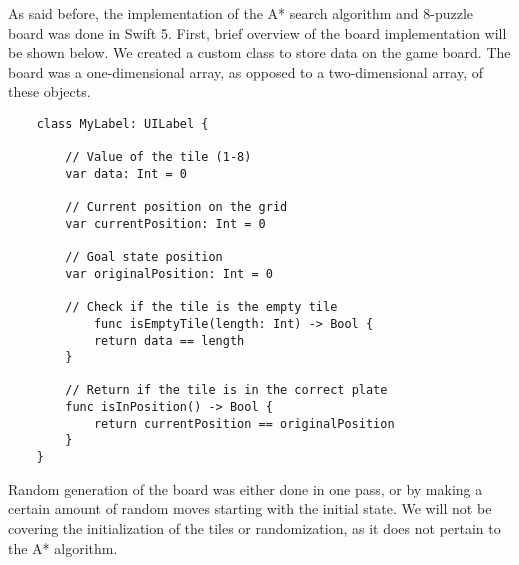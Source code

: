 \documentclass[titlepage]{article}
\begin{document}
As said before, the implementation of the A* search algorithm and 8-puzzle board was done in Swift 5. First, brief overview of the board implementation will be shown below. We created a custom class to store data on the game board. The board was a one-dimensional array, as opposed to a two-dimensional array, of these objects. 
\vspace{6mm}

\begin{lstlisting}
	class MyLabel: UILabel {
	
		// Value of the tile (1-8)
		var data: Int = 0
	
		// Current position on the grid
		var currentPosition: Int = 0
	
		// Goal state position
		var originalPosition: Int = 0
		
		// Check if the tile is the empty tile
			func isEmptyTile(length: Int) -> Bool {
			return data == length
		}
	
		// Return if the tile is in the correct plate
		func isInPosition() -> Bool {
			return currentPosition == originalPosition
		}
	}
\end{lstlisting}
\vspace{6mm}
Random generation of the board was either done in one pass, or by making a certain amount of random moves starting with the initial state. We will not be covering the initialization of the tiles or randomization, as it does not pertain to the A* algorithm.
\newline
\end{document}
